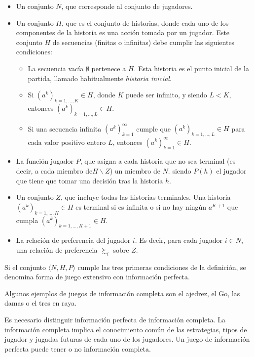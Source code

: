 \begin{itemize}
\item Un conjunto $N$, que corresponde al conjunto de jugadores.
\item Un conjunto $H$, que es el conjunto de historias, donde cada uno de los componentes de la historia es una acción tomada por un jugador. Este conjunto $H$ de secuencias (finitas o infinitas) debe cumplir las siguientes condiciones:
\begin{itemize}
\item La secuencia vacía $\emptyset$ pertenece a $H$. Esta historia es el punto inicial de la partida, llamado habitualmente \textit{historia inicial}.
\item Si $(a^k)_{k=1,...,K}\in H$, donde $K$ puede ser infinito, y siendo $L< K$, entonces $(a^k)_{k=1,...,L}\in H$.
\item Si una secuencia infinita $(a^k)^\infty_{k=1}$ cumple que $(a^k)_{k=1,...,L}\in H$ para cada valor positivo entero $L$, entonces  $(a^k)^\infty_{k=1}\in H$.
   \end{itemize}
\item La función jugador $P$, que asigna a cada historia que no sea terminal (es decir, a cada miembro de$ H\backslash  Z$) un miembro de $N$. siendo $P(h)$ el jugador que tiene que tomar una decisión tras la historia $h$.
\item Un conjunto $Z$, que incluye todas las historias terminales. Una historia $(a^k)_{k=1,...,K}\in H$ es terminal si es infinita o si no hay ningún $a^{K+1}$ que cumpla  $(a^k)_{k=1,...,K+1}\in H$.
\item La relación de preferencia del jugador $i$. Es decir, para cada jugador $i \in N$, una relación de preferencia $\succsim_i$ sobre $Z$.
\end{itemize} 

Si el conjunto $\langle N,H,P\rangle$    cumple las tres primeras condiciones de la definición, se denomina forma de juego extensivo con información perfecta. \cite{Gametheory}

Algunos ejemplos de juegos de información completa son el ajedrez, el Go, las damas o el tres en raya.

Es necesario distinguir información perfecta de información completa. La información completa implica el conocimiento común de las estrategias, tipos de jugador y jugadas futuras de cada uno de los jugadores. Un juego de información perfecta puede tener o no información completa.

